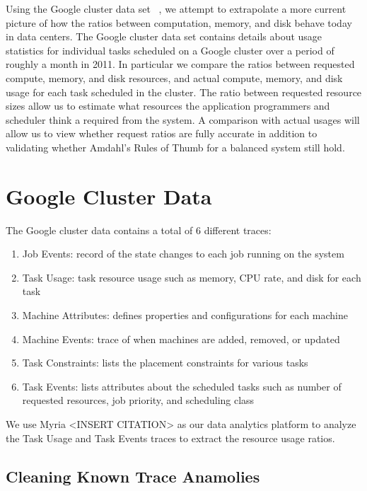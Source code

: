 \documentclass{sig-alternate}
\begin{document}
Using the Google cluster data set ~\cite{clusterdata:Wilkes2011, clusterdata:Reiss2011}, we attempt to extrapolate a more current picture of how the ratios between computation, memory, and disk behave today in data centers.
The Google cluster data set contains details about usage statistics for individual tasks scheduled on a Google cluster over a period of roughly a month in 2011.
In particular we compare the ratios between requested compute, memory, and disk resources, and actual compute, memory, and disk usage for each task scheduled in the cluster.
The ratio between requested resource sizes allow us to estimate what resources the application programmers and scheduler think a required from the system.
A comparison with actual usages will allow us to view whether request ratios are fully accurate in addition to validating whether Amdahl's Rules of Thumb for a balanced system still hold.



\section{Google Cluster Data}

The Google cluster data contains a total of 6 different traces:
\begin{enumerate}
\item Job Events: record of the state changes to each job running on the system
\item Task Usage: task resource usage such as memory, CPU rate, and disk for each task
\item Machine Attributes: defines properties and configurations for each machine
\item Machine Events: trace of when machines are added, removed, or updated
\item Task Constraints: lists the placement constraints for various tasks
\item Task Events: lists attributes about the scheduled tasks such as number of requested resources, job priority, and scheduling class
\end{enumerate}
We use Myria <INSERT CITATION> as our data analytics platform to analyze the Task Usage and Task Events traces to extract the resource usage ratios.

\subsection{Cleaning Known Trace Anamolies}
\end{document}
